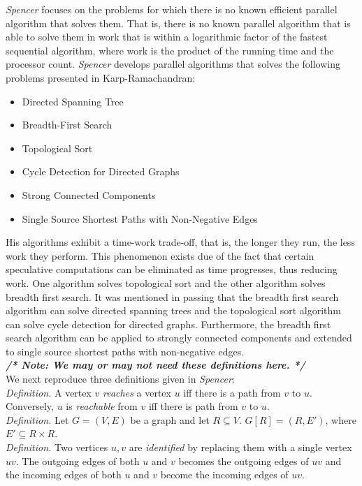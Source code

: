 \documentclass[paper=a4, fontsize=11pt]{scrartcl} %
\numberwithin{equation}{section} %
\numberwithin{figure}{section} %
\numberwithin{table}{section} %
\begin{document}
\textit{Spencer\cite{S97}} focuses on the problems for which there is no known efficient parallel algorithm that solves them. That is, there is no known parallel algorithm that is able to solve them in work that is within a logarithmic factor of the fastest sequential algorithm, where work is the product of the running time and the processor count. \textit{Spencer\cite{S97}} develops parallel algorithms that solves the following problems presented in Karp-Ramachandran\cite{KR90}:

\begin{itemize}
\item Directed Spanning Tree
\item Breadth-First Search
\item Topological Sort
\item Cycle Detection for Directed Graphs
\item Strong Connected Components
\item Single Source Shortest Paths with Non-Negative Edges
\end{itemize}

His algorithms exhibit a time-work trade-off, that is, the longer they run, the less work they perform. This phenomenon exists due of the fact that certain speculative computations can be eliminated as time progresses, thus reducing work. One algorithm solves topological sort and the other algorithm solves breadth first search. It was mentioned in passing that the breadth first search algorithm can solve directed spanning trees and the topological sort algorithm can solve cycle detection for directed graphs. Furthermore, the breadth first search algorithm can be applied to strongly connected components and extended to single source shortest paths with non-negative edges.\\

\textbf{\textit{/* Note: We may or may not need these definitions here. */}}\\
We next reproduce three definitions given in \textit{Spencer\cite{S97}}:\\
\indent\emph{Definition.} A vertex $v$ \textit{reaches} a vertex $u$ iff there is a path from $v$ to $u$. Conversely, $u$ is \textit{reachable} from $v$ iff there is path from $v$ to $u$.\\
\indent\emph{Definition.} Let $G = (V, E)$ be a graph and let $R \subseteq V$. $G[R] = (R, E')$, where $E' \subseteq R \times R$.\\
\indent\emph{Definition.} Two vertices $u,v$ are \textit{identified} by replacing them with a single vertex $uv$. The outgoing edges of both $u$ and $v$ becomes the outgoing edges of $uv$ and the incoming edges of both $u$ and $v$ become the incoming edges of $uv$.
\end{document}
